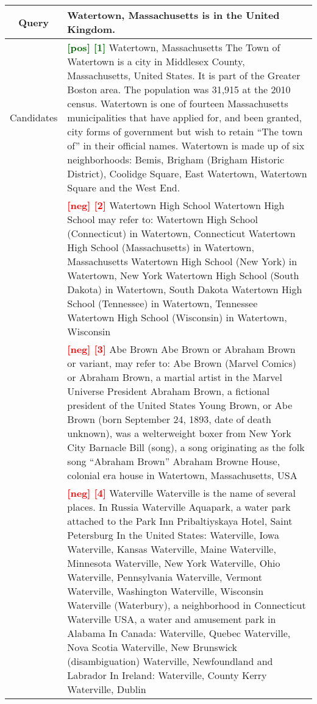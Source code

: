 \begin{table*}[ht]
    \centering
    \small
    \begin{tabularx}{\textwidth}{c|X} %
        \toprule
        Query & Watertown, Massachusetts is in the United Kingdom. \\ \midrule
        Candidates & \textbf{\textcolor{darkgreen}{[pos] [1]}} Watertown, Massachusetts The Town of Watertown is a city in Middlesex County, Massachusetts, United States. It is part of the Greater Boston area. The population was 31,915 at the 2010 census. Watertown is one of fourteen Massachusetts municipalities that have applied for, and been granted, city forms of government but wish to retain ``The town of'' in their official names. Watertown is made up of six neighborhoods: Bemis, Brigham (Brigham Historic District), Coolidge Square, East Watertown, Watertown Square and the West End. \\ 
        & \textbf{\textcolor{red}{[neg] [2]}} Watertown High School Watertown High School may refer to: Watertown High School (Connecticut) in Watertown, Connecticut  Watertown High School (Massachusetts) in Watertown, Massachusetts  Watertown High School (New York) in Watertown, New York  Watertown High School (South Dakota) in Watertown, South Dakota  Watertown High School (Tennessee) in Watertown, Tennessee  Watertown High School (Wisconsin) in Watertown, Wisconsin \\ 
        & \textbf{\textcolor{red}{[neg] [3]}} Abe Brown Abe Brown or Abraham Brown or variant, may refer to:  Abe Brown (Marvel Comics) or Abraham Brown, a martial artist in the Marvel Universe  President Abraham Brown, a fictional president of the United States  Young Brown, or Abe Brown (born September 24, 1893, date of death unknown), was a welterweight boxer from New York City  Barnacle Bill (song), a song originating as the folk song ``Abraham Brown''  Abraham Browne House, colonial era house in Watertown, Massachusetts, USA \\ 
        & \textbf{\textcolor{red}{[neg] [4]}} Waterville Waterville is the name of several places. In Russia Waterville Aquapark, a water park attached to the Park Inn Pribaltiyskaya Hotel, Saint Petersburg In the United States: Waterville, Iowa Waterville, Kansas Waterville, Maine Waterville, Minnesota Waterville, New York Waterville, Ohio Waterville, Pennsylvania Waterville, Vermont Waterville, Washington Waterville, Wisconsin Waterville (Waterbury), a neighborhood in Connecticut Waterville USA, a water and amusement park in Alabama In Canada: Waterville, Quebec Waterville, Nova Scotia Waterville, New Brunswick (disambiguation) Waterville, Newfoundland and Labrador In Ireland: Waterville, County Kerry Waterville, Dublin \\

\end{tabularx}
\end{table*}

